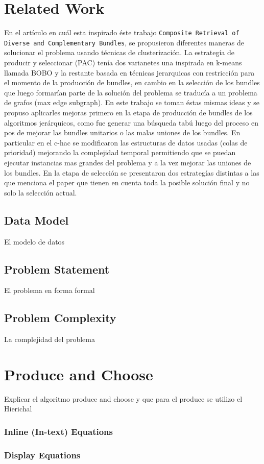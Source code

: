 \section{Related Work}
En el artículo en cuál esta inspirado éste trabajo \texttt{Composite Retrieval of Diverse and Complementary Bundles}, se propusieron diferentes maneras de solucionar el problema usando técnicas de clusterización. La estrategía de producir y seleccionar (PAC) tenía dos varianetes una inspirada en k-means llamada BOBO y la restante basada en técnicas jerarquicas con restricción para el momento de la producción de bundles, en cambio en la selección de los bundles que luego formarían parte de la solución del problema se traducía a un problema de grafos (max edge subgraph). En este trabajo se toman éstas mismas ideas y se propuso aplicarles mejoras primero en la etapa de producción de bundles de los algoritmos jerárquicos, como fue generar una búsqueda tabú luego del proceso en pos de mejorar las bundles unitarios o las malas uniones de los bundles. En particular en el c-hac se modificaron las estructuras de datos usadas (colas de prioridad) mejorando la complejidad temporal permitiendo que se puedan ejecutar instancias mas grandes del problema y a la vez mejorar las uniones de los bundles. En la etapa de selección se presentaron dos estrategías distintas a las que menciona el paper que tienen en cuenta toda la posible solución final y no solo la selección actual.
\subsection{Data Model}
El modelo de datos
\subsection{Problem Statement}
El problema en forma formal
\subsection{Problem Complexity}
La complejidad del problema
\section{Produce and Choose}
Explicar el algoritmo produce and choose y que para el produce se utilizo el Hierichal
\subsubsection{Inline (In-text) Equations}
\subsubsection{Display Equations}
